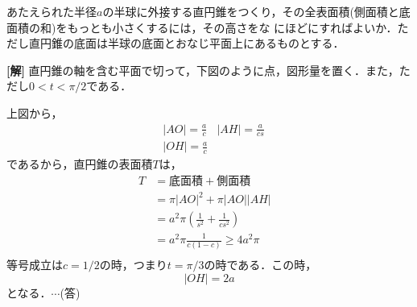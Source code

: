 \documentclass[a4j]{jarticle}
\begin{document}

     \begin{oframed}
     あたえられた半径$a$の半球に外接する直円錐をつくり，その全表面積(側面積と底面積の和)をもっとも小さくするには，その高さをな
     にほどにすればよいか．ただし直円錐の底面は半球の底面とおなじ平面上にあるものとする．
     \end{oframed}

\setlength{\columnseprule}{0.4pt}
\begin{multicols}{2}
{\bf[解]} 直円錐の軸を含む平面で切って，下図のように点，図形量を置く．また，\2ただし$0<t<\pi/2$である．
     \begin{center}
     \scalebox{1}{}
     \end{center}
上図から，
     \begin{align*}
     &|AO|=\frac{a}{c}&|AH|=\frac{a}{cs} \\
     &|OH|=\frac{a}{c}
     \end{align*}
であるから，直円錐の表面積$T$は，
     \begin{align*}
     T&=\text{底面積}+\text{側面積} \\
     &=\pi|AO|^2+\pi|AO||AH| \\
     &=a^2\pi\left(\frac{1}{s^2}+\frac{1}{cs^2}\right) \\     
     &=a^2\pi\frac{1}{c(1-c)}\ge 4a^2\pi &\\
     \end{align*}
等号成立は$c=1/2$の時，つまり$t=\pi/3$の時である．この時，
　　　　　\[|OH|=2a\]
となる．$\cdots$(答)
\newpage
\end{multicols}
\end{document}
